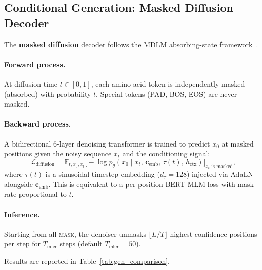 \subsection{Conditional Generation: Masked Diffusion Decoder}
\label{sec:methods_diffusion}

The \textbf{masked diffusion} decoder follows the MDLM absorbing-state
framework~\citep{sahoo2024mdlm,austin2021d3pm}.

\paragraph{Forward process.}
At diffusion time $t \in [0,1]$, each amino acid token is independently
masked (absorbed) with probability $t$.
Special tokens (PAD, BOS, EOS) are never masked.

\paragraph{Backward process.}
A bidirectional 6-layer denoising transformer is trained to predict $x_0$ at
masked positions given the noisy sequence $x_t$ and the conditioning signal:
\begin{equation}
  \mathcal{L}_\text{diffusion} =
  \mathbb{E}_{t, x_0, x_t}
  \bigl[-\log p_\theta(x_0 \mid x_t,\,\mathbf{c}_\text{emb},\,\tau(t),
  \,h_\text{ctx})\bigr]_{x_t \text{ is masked}},
\end{equation}
where $\tau(t)$ is a sinusoidal timestep embedding
($d_\tau=128$) injected via AdaLN alongside $\mathbf{c}_\text{emb}$.
This is equivalent to a per-position BERT MLM loss with mask rate
proportional to $t$.

\paragraph{Inference.}
Starting from all-\textsc{mask}, the denoiser unmasks
$\lfloor L/T \rfloor$ highest-confidence positions per step for $T_\text{infer}$
steps (default $T_\text{infer}=50$).

Results are reported in Table~\ref{tab:gen_comparison}.
